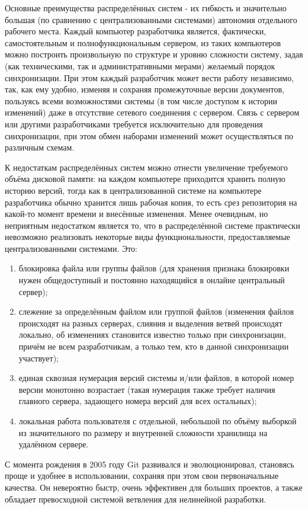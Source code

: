 \documentclass[a4paper,14pt]{report} %
\begin{document}
Основные преимущества распределённых систем - их гибкость и значительно большая (по сравнению с централизованными системами) автономия отдельного рабочего места. Каждый компьютер разработчика является, фактически, самостоятельным и полнофункциональным сервером, из таких компьютеров можно построить произвольную по структуре и уровню сложности систему, задав (как техническими, так и административными мерами) желаемый порядок синхронизации. При этом каждый разработчик может вести работу независимо, так, как ему удобно, изменяя и сохраняя промежуточные версии документов, пользуясь всеми возможностями системы (в том числе доступом к истории изменений) даже в отсутствие сетевого соединения с сервером. Связь с сервером или другими разработчиками требуется исключительно для проведения синхронизации, при этом обмен наборами изменений может осуществляться по различным схемам.\par
К недостаткам распределённых систем можно отнести увеличение требуемого объёма дисковой памяти: на каждом компьютере приходится хранить полную историю версий, тогда как в централизованной системе на компьютере разработчика обычно хранится лишь рабочая копия, то есть срез репозитория на какой-то момент времени и внесённые изменения. Менее очевидным, но неприятным недостатком является то, что в распределённой системе практически невозможно реализовать некоторые виды функциональности, предоставляемые централизованными системами. Это:
\begin{enumerate} %
\item блокировка файла или группы файлов (для хранения признака блокировки нужен общедоступный и постоянно находящийся в онлайне центральный сервер);
\item слежение за определённым файлом или группой файлов (изменения файлов происходят на разных серверах, слияния и выделения ветвей происходят локально, об изменениях становится известно только при синхронизации, причём не всем разработчикам, а только тем, кто в данной синхронизации участвует);
\item единая сквозная нумерация версий системы и/или файлов, в которой номер версии монотонно возрастает (такая нумерация также требует наличия главного сервера, задающего номера версий для всех остальных);
\item локальная работа пользователя с отдельной, небольшой по объёму выборкой из значительного по размеру и внутренней сложности хранилища на удалённом сервере.
\end{enumerate}\par
С момента рождения в 2005 году Git развивался и эволюционировал, становясь проще и удобнее в использовании, сохраняя при этом свои первоначальные качества. Он невероятно быстр, очень эффективен для больших проектов, а также обладает превосходной системой ветвления для нелинейной разработки.
\end{document}
